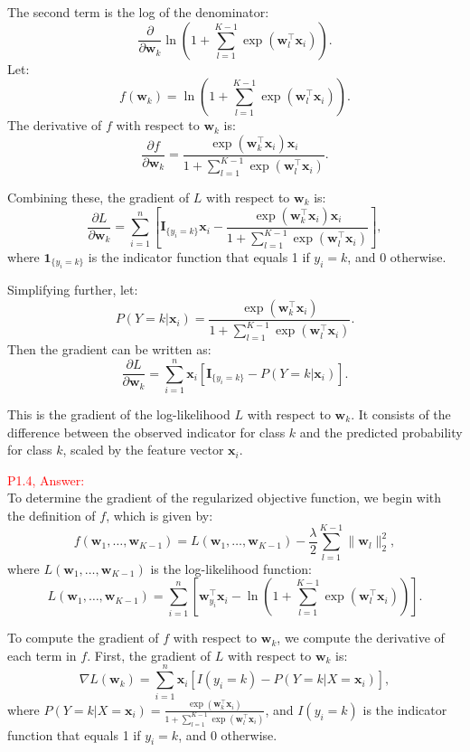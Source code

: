 \documentclass[11pt]{article}
\begin{document}
The second term is the log of the denominator:
\[
\frac{\partial}{\partial \mathbf{w}_k} \ln \left( 1 + \sum_{l=1}^{K-1} \exp(\mathbf{w}_l^\top \mathbf{x}_i) \right).
\]
Let:
\[
f(\mathbf{w}_k) = \ln \left( 1 + \sum_{l=1}^{K-1} \exp(\mathbf{w}_l^\top \mathbf{x}_i) \right).
\]
The derivative of \( f \) with respect to \( \mathbf{w}_k \) is:
\[
\frac{\partial f}{\partial \mathbf{w}_k} = \frac{\exp(\mathbf{w}_k^\top \mathbf{x}_i) \mathbf{x}_i}{1 + \sum_{l=1}^{K-1} \exp(\mathbf{w}_l^\top \mathbf{x}_i)}.
\]

Combining these, the gradient of \( L \) with respect to \( \mathbf{w}_k \) is:
\[
\frac{\partial L}{\partial \mathbf{w}_k} = \sum_{i=1}^n \left[ \mathbf{I}_{\{y_i = k\}} \mathbf{x}_i - \frac{\exp(\mathbf{w}_k^\top \mathbf{x}_i) \mathbf{x}_i}{1 + \sum_{l=1}^{K-1} \exp(\mathbf{w}_l^\top \mathbf{x}_i)} \right],
\]
where \( \mathbf{1}_{\{y_i = k\}} \) is the indicator function that equals 1 if \( y_i = k \), and 0 otherwise.

Simplifying further, let:
\[
P(Y = k | \mathbf{x}_i) = \frac{\exp(\mathbf{w}_k^\top \mathbf{x}_i)}{1 + \sum_{l=1}^{K-1} \exp(\mathbf{w}_l^\top \mathbf{x}_i)}.
\]
Then the gradient can be written as:
\[
\frac{\partial L}{\partial \mathbf{w}_k} = \sum_{i=1}^n \mathbf{x}_i \left[ \mathbf{I}_{\{y_i = k\}} - P(Y = k | \mathbf{x}_i) \right].
\]

This is the gradient of the log-likelihood \( L \) with respect to \( \mathbf{w}_k \). It consists of the difference between the observed indicator for class \( k \) and the predicted probability for class \( k \), scaled by the feature vector \( \mathbf{x}_i \).


\textcolor{red}{P1.4, Answer:}\\

To determine the gradient of the regularized objective function, we begin with the definition of \( f \), which is given by:
\[
f(\mathbf{w}_1, \dots, \mathbf{w}_{K-1}) = L(\mathbf{w}_1, \dots, \mathbf{w}_{K-1}) - \frac{\lambda}{2} \sum_{l=1}^{K-1} \|\mathbf{w}_l\|_2^2,
\]
where \( L(\mathbf{w}_1, \dots, \mathbf{w}_{K-1}) \) is the log-likelihood function:
\[
L(\mathbf{w}_1, \dots, \mathbf{w}_{K-1}) = \sum_{i=1}^n \left[ \mathbf{w}_{y_i}^\top \mathbf{x}_i - \ln \left( 1 + \sum_{l=1}^{K-1} \exp(\mathbf{w}_l^\top \mathbf{x}_i) \right) \right].
\]

To compute the gradient of \( f \) with respect to \( \mathbf{w}_k \), we compute the derivative of each term in \( f \). First, the gradient of \( L \) with respect to \( \mathbf{w}_k \) is:
\[
\nabla L(\mathbf{w}_k) = \sum_{i=1}^n \mathbf{x}_i \left[ I(y_i = k) - P(Y = k | X = \mathbf{x}_i) \right],
\]
where \( P(Y = k | X = \mathbf{x}_i) = \frac{\exp(\mathbf{w}_k^\top \mathbf{x}_i)}{1 + \sum_{l=1}^{K-1} \exp(\mathbf{w}_l^\top \mathbf{x}_i)} \), and \( I(y_i = k) \) is the indicator function that equals 1 if \( y_i = k \), and 0 otherwise.
\end{document}
